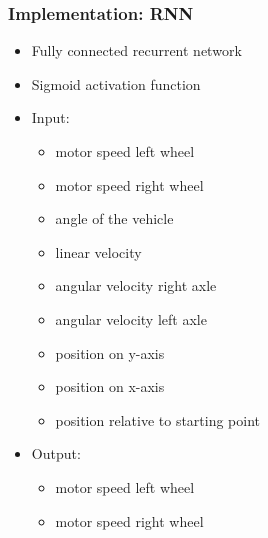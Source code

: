 \documentclass{beamer}
\begin{document}
\begin{frame}[fragile]
  \frametitle{Implementation: RNN}
  \begin{itemize}
    \item Fully connected recurrent network
    \item Sigmoid activation function
    \item Input:
      \begin{itemize}
	\item motor speed left wheel
	\item motor speed right wheel
	\item angle of the vehicle
	\item linear velocity
	\item angular velocity right axle
	\item angular velocity left axle
	\item position on y-axis
	\item position on x-axis
	\item position relative to starting point
      \end{itemize}
    \item Output:
      \begin{itemize}
	\item motor speed left wheel
	\item motor speed right wheel
      \end{itemize}
  \end{itemize}
\end{frame}
\end{document}
